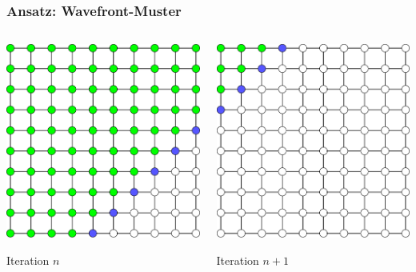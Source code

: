 \documentclass{beamer}
\begin{document}
\begin{frame}
    \frametitle{Ansatz: Wavefront-Muster}
    \begin{columns}
        \begin{column}{0.5\textwidth}
            \includegraphics[width=\textwidth]{wavefront1}
                        
            \centering Iteration $n$
        \end{column}
        \begin{column}{0.5\textwidth}
            \includegraphics[width=\textwidth]{wavefront2}
            
            \centering Iteration $n+1$
        \end{column}
    \end{columns}
\end{frame}
\end{document}
